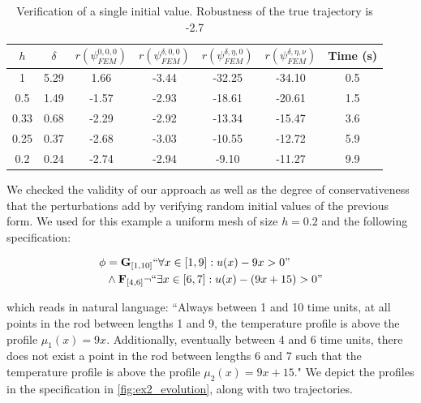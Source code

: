 \documentclass[oribibl]{llncs/llncs}
\newcommand{\Always}{\mathbf{G}}
\newcommand{\Event}{\mathbf{F}}
\begin{document}
\begin{table}
\centering
\begin{tabular}{|c|c|c|c|c|c|c|}
    \hline
    $h$ & $\delta$ & $r(\psi_{FEM}^{0, 0, 0})$ & $r(\psi_{FEM}^{\delta, 0, 0})$ &
    $r(\psi_{FEM}^{\delta, \eta, 0})$ & $r(\psi_{FEM}^{\delta, \eta,
\nu})$ & Time (s)  \\
    \hline
    1 & 5.29 & 1.66 & -3.44 & -32.25 & -34.10 & 0.5 \\
    0.5 & 1.49 & -1.57 & -2.93 & -18.61 & -20.61 & 1.5 \\
    0.33 & 0.68 & -2.29 & -2.92 & -13.34 & -15.47 & 3.6 \\
    0.25 & 0.37 & -2.68 & -3.03 & -10.55 & -12.72 & 5.9 \\
    0.2 & 0.24 & -2.74 & -2.94 & -9.10 & -11.27 & 9.9 \\
    \hline
\end{tabular}
\caption{Verification of a single initial value. Robustness of the true
trajectory is -2.7}
\label{tab:res_meshes}
\end{table}

We checked the validity of our approach as well as the degree of
conservativeness that the perturbations add by verifying random initial values
of the previous form. We used for this example a uniform mesh of size $h = 0.2$
and the following specification: 

\begin{equation}
    \begin{aligned}
        \phi &= \Always_{[1, 10]} ``\forall x \in [1, 9]: u(x) - 9x > 0" \\
        &\wedge \Event_{[4, 6]} \lnot ``\exists x \in [6, 7]: u(x) - (9x + 15) > 0"
\end{aligned}
\end{equation}

which reads in natural language: ``Always between 1 and 10 time units, at all
points in the rod between lengths 1 and 9, the temperature profile is above the
profile $\mu_1(x) = 9x$. Additionally, eventually between 4 and 6 time units,
there does not exist a point in the rod between lengths 6 and 7 such that the
temperature profile is above the profile $\mu_2(x) = 9x + 15$." We depict the
profiles in the specification in \cref{fig:ex2_evolution}, along with two
trajectories.
\end{document}
